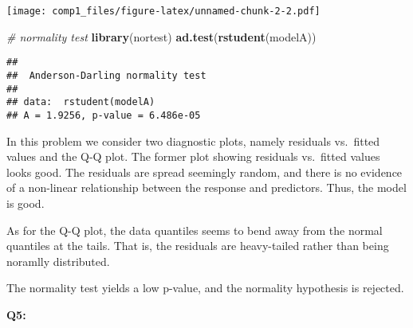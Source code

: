 \documentclass[]{article}
\newenvironment{Shaded}{\begin{snugshade}}{\end{snugshade}}
\newcommand{\KeywordTok}[1]{\textcolor[rgb]{0.13,0.29,0.53}{\textbf{#1}}}
\newcommand{\DataTypeTok}[1]{\textcolor[rgb]{0.13,0.29,0.53}{#1}}
\newcommand{\DecValTok}[1]{\textcolor[rgb]{0.00,0.00,0.81}{#1}}
\newcommand{\FloatTok}[1]{\textcolor[rgb]{0.00,0.00,0.81}{#1}}
\newcommand{\StringTok}[1]{\textcolor[rgb]{0.31,0.60,0.02}{#1}}
\newcommand{\CommentTok}[1]{\textcolor[rgb]{0.56,0.35,0.01}{\textit{#1}}}
\newcommand{\OtherTok}[1]{\textcolor[rgb]{0.56,0.35,0.01}{#1}}
\newcommand{\OperatorTok}[1]{\textcolor[rgb]{0.81,0.36,0.00}{\textbf{#1}}}
\newcommand{\NormalTok}[1]{#1}
\begin{document}
\texttt{[image: comp1\_files/figure-latex/unnamed-chunk-2-2.pdf]}

\begin{Shaded}
\begin{Highlighting}[]
\CommentTok{# normality test}
\KeywordTok{library}\NormalTok{(nortest) }
\KeywordTok{ad.test}\NormalTok{(}\KeywordTok{rstudent}\NormalTok{(modelA))}
\end{Highlighting}
\end{Shaded}

\begin{verbatim}
## 
##  Anderson-Darling normality test
## 
## data:  rstudent(modelA)
## A = 1.9256, p-value = 6.486e-05
\end{verbatim}

In this problem we consider two diagnostic plots, namely residuals
vs.~fitted values and the Q-Q plot. The former plot showing residuals
vs.~fitted values looks good. The residuals are spread seemingly random,
and there is no evidence of a non-linear relationship between the
response and predictors. Thus, the model is good.

As for the Q-Q plot, the data quantiles seems to bend away from the
normal quantiles at the tails. That is, the residuals are heavy-tailed
rather than being noramlly distributed.

The normality test yields a low p-value, and the normality hypothesis is
rejected.

\textbf{Q5:}

\begin{Shaded}
\end{Shaded}
\end{document}
